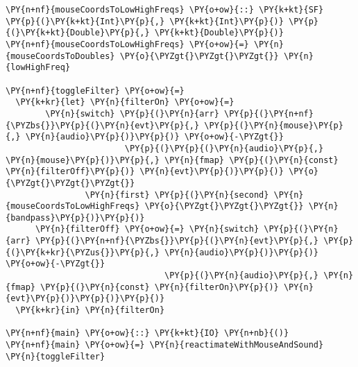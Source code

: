 \begin{Verbatim}[commandchars=\\\{\}]
\PY{n+nf}{mouseCoordsToLowHighFreqs} \PY{o+ow}{::} \PY{k+kt}{SF} \PY{p}{(}\PY{k+kt}{Int}\PY{p}{,} \PY{k+kt}{Int}\PY{p}{)} \PY{p}{(}\PY{k+kt}{Double}\PY{p}{,} \PY{k+kt}{Double}\PY{p}{)} 
\PY{n+nf}{mouseCoordsToLowHighFreqs} \PY{o+ow}{=} \PY{n}{mouseCoordsToDoubles} \PY{o}{\PYZgt{}\PYZgt{}\PYZgt{}} \PY{n}{lowHighFreq}

\PY{n+nf}{toggleFilter} \PY{o+ow}{=} 
  \PY{k+kr}{let} \PY{n}{filterOn} \PY{o+ow}{=} 
        \PY{n}{switch} \PY{p}{(}\PY{n}{arr} \PY{p}{(}\PY{n+nf}{\PYZbs{}}\PY{p}{(}\PY{n}{evt}\PY{p}{,} \PY{p}{(}\PY{n}{mouse}\PY{p}{,} \PY{n}{audio}\PY{p}{)}\PY{p}{)} \PY{o+ow}{-\PYZgt{}} 
                        \PY{p}{(}\PY{p}{(}\PY{n}{audio}\PY{p}{,} \PY{n}{mouse}\PY{p}{)}\PY{p}{,} \PY{n}{fmap} \PY{p}{(}\PY{n}{const} \PY{n}{filterOff}\PY{p}{)} \PY{n}{evt}\PY{p}{)}\PY{p}{)} \PY{o}{\PYZgt{}\PYZgt{}\PYZgt{}}
                \PY{n}{first} \PY{p}{(}\PY{n}{second} \PY{n}{mouseCoordsToLowHighFreqs} \PY{o}{\PYZgt{}\PYZgt{}\PYZgt{}} \PY{n}{bandpass}\PY{p}{)}\PY{p}{)}
      \PY{n}{filterOff} \PY{o+ow}{=} \PY{n}{switch} \PY{p}{(}\PY{n}{arr} \PY{p}{(}\PY{n+nf}{\PYZbs{}}\PY{p}{(}\PY{n}{evt}\PY{p}{,} \PY{p}{(}\PY{k+kr}{\PYZus{}}\PY{p}{,} \PY{n}{audio}\PY{p}{)}\PY{p}{)} \PY{o+ow}{-\PYZgt{}}
                                \PY{p}{(}\PY{n}{audio}\PY{p}{,} \PY{n}{fmap} \PY{p}{(}\PY{n}{const} \PY{n}{filterOn}\PY{p}{)} \PY{n}{evt}\PY{p}{)}\PY{p}{)}\PY{p}{)}
  \PY{k+kr}{in} \PY{n}{filterOn}

\PY{n+nf}{main} \PY{o+ow}{::} \PY{k+kt}{IO} \PY{n+nb}{()}
\PY{n+nf}{main} \PY{o+ow}{=} \PY{n}{reactimateWithMouseAndSound} \PY{n}{toggleFilter}
\end{Verbatim}
